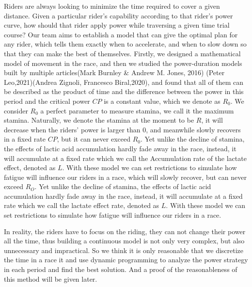 \documentclass[12pt]{article}
\begin{document}
Riders are always looking to minimize the time required to cover a given distance. Given a
particular rider's capability according to that rider's power curve, how should that rider apply
power while traversing a given time trial course?
Our team aims to establish a model that can give the optimal plan for any  rider, which tells them exactly when to accelerate,
and when to slow down so that they can make the best of themselves. Firstly, we designed a mathematical model of movement in the race, and then we studied the power-duration models built by multiple articles(Mark Burnley \& Andrew M. Jones, 2016)\cite{doi:10.1080/17461391.2016.1249524}
(Peter Leo,2021)\cite{leo2021power}(Andrea Zignoli, Francesco Biral,2020)\cite{zignoli2020prediction}, and found that all of them can be described as the product of time and the difference
between the power in this period and the critical power $CP$ is a constant value, which we denote as $R_0$. We consider $R_0$ a perfect parameter to measure stamina, we call
it the maximum stamina. Naturally, we denote the stamina at the moment to be $R$, it
will decrease when the riders' power is larger than 0, and meanwhile slowly recovers in a fixed rate $CP$,
but it can never exceed $R_0$. Yet unlike the decline of stamina, the effects of lactic acid accumulation hardly fade away in the race, instead,
it will accumulate at a fixed rate which we call the Accumulation rate of the lactate effect, denoted as $L$. With these model we can set restrictions
to simulate how fatigue will influence our riders in a race,
which will slowly recover, but can never exceed $R_O$. Yet unlike the decline of stamina, the effects of lactic acid accumulation hardly fade away
in the race, instead, it will accumulate at a fixed rate which we call the lactate effect rate, denoted as $L$. With these model we can set restrictions
to simulate how fatigue will influence our riders in a race.

In reality, the riders have to focus on the riding, they can not change their power all the time, thus building a continuous model is not only very complex, but also unnecessary and impractical.
So we think it is only reasonable that we discretize the time in a race  it and use dynamic programming to analyze the power strategy in each period and find the best solution. And a proof of
the reasonableness of this method will be given later.
\end{document}

